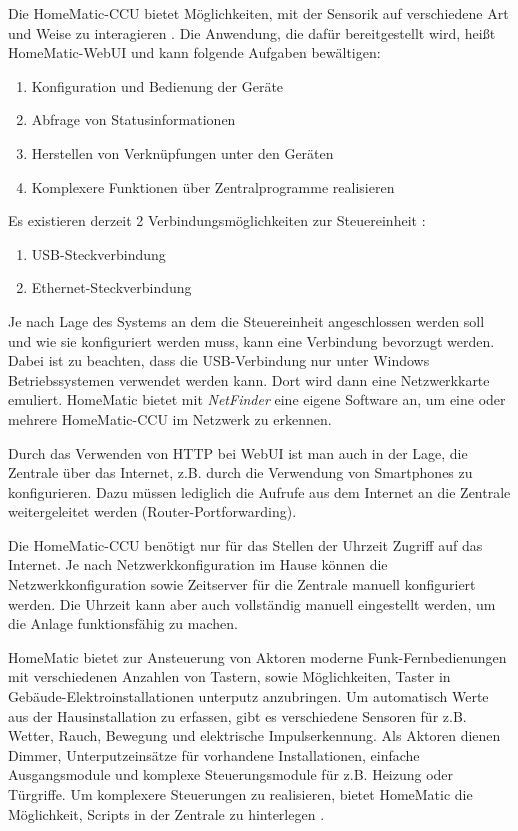 Die HomeMatic-CCU bietet Möglichkeiten, mit der Sensorik auf verschiedene Art und Weise zu
interagieren \cite[Seite 6]{homematic_ccu}.
Die Anwendung, die dafür bereitgestellt wird, heißt HomeMatic-WebUI \cite{homematic_webui_manual}
und kann folgende Aufgaben bewältigen:
\begin{enumerate}
\item Konfiguration und Bedienung der Geräte
\item Abfrage von Statusinformationen
\item Herstellen von Verknüpfungen unter den Geräten
\item Komplexere Funktionen über Zentralprogramme realisieren
\end{enumerate}

Es existieren derzeit 2 Verbindungsmöglichkeiten zur Steuereinheit \cite[Seite 10]{homematic_ccu}:
\begin{enumerate}
\item USB-Steckverbindung
\item Ethernet-Steckverbindung
\end{enumerate}

Je nach Lage des Systems an dem die Steuereinheit angeschlossen werden soll und wie sie konfiguriert
werden muss, kann eine Verbindung bevorzugt werden.
Dabei ist zu beachten, dass die USB-Verbindung nur unter Windows Betriebssystemen
verwendet werden kann.
Dort wird dann eine Netzwerkkarte emuliert.
HomeMatic bietet mit \emph{NetFinder} eine eigene Software an, um eine oder mehrere
HomeMatic-CCU im Netzwerk zu erkennen.

Durch das Verwenden von HTTP bei WebUI ist man auch in der Lage, die Zentrale
über das Internet, z.B. durch die Verwendung von Smartphones zu konfigurieren.
Dazu müssen lediglich die Aufrufe aus dem Internet an die Zentrale weitergeleitet werden
(Router-Portforwarding).

Die HomeMatic-CCU benötigt nur für das Stellen der Uhrzeit Zugriff auf das Internet.
Je nach Netzwerkkonfiguration im Hause können die Netzwerkkonfiguration sowie Zeitserver
für die Zentrale manuell konfiguriert werden.
Die Uhrzeit kann aber auch vollständig manuell eingestellt werden, um die Anlage
funktionsfähig zu machen.

HomeMatic bietet zur Ansteuerung von Aktoren moderne Funk-Fernbedienungen mit verschiedenen
Anzahlen von Tastern, sowie Möglichkeiten, Taster in Gebäude-Elektroinstallationen unterputz anzubringen.
Um automatisch Werte aus der Hausinstallation zu erfassen, gibt es verschiedene Sensoren für z.B.
Wetter, Rauch, Bewegung und elektrische Impulserkennung.
Als Aktoren dienen Dimmer, Unterputzeinsätze für vorhandene Installationen, einfache Ausgangsmodule und
komplexe Steuerungsmodule für z.B. Heizung oder Türgriffe.
Um komplexere Steuerungen zu realisieren, bietet HomeMatic die Möglichkeit, Scripts in der Zentrale
zu hinterlegen \cite{hmscript1}.

